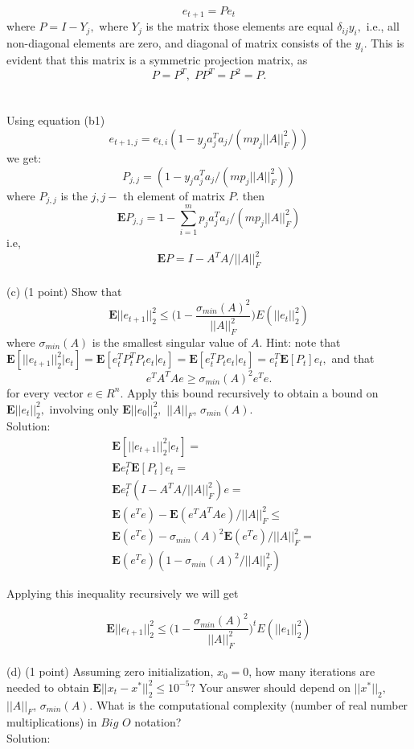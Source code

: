 \documentclass{article}
\begin{document}
$$
e_{t + 1} = P e_t
$$
where $P = I - Y_j,$ where $Y_j$ is the matrix those
elements are equal $\delta_{ij} y_i, $ i.e., all non-diagonal elements are zero, and diagonal of matrix consists of the $y_i.$
This is evident that this matrix is a symmetric projection matrix, as 
$$
P = P^T, \; PP^T = P^2 = P.
$$ \\ \\
Using equation (b1) 
$$
e_{t + 1, j} = e_{t, i}(1 - y_j a_j^Ta_j/(m p_j ||A||_F^2))
$$
we get:
$$
P_{j, j} = (1 - y_j a_j^Ta_j/(m p_j ||A||_F^2))
$$
where $P_{j, j}$ is the $j, j-$ th element of matrix $P.$
then
$$
\mathbf{E}P_{j, j} = 1 - \sum_{i=1}^{m} p_j a_j^Ta_j/(m p_j ||A||_F^2) 
$$
i.e, 
$$
\mathbf{E}P = I - A^TA/||A||_F^2
$$
\\

(c) (1 point) Show that\\
$$
\mathbf{E}||e_{t+1}||^2_2 \leq 
\big(1 - \frac{\sigma_{min}(A)^2}{||A||_F^2}\big) E(||e_t||^2_2)
$$
where $\sigma_{min}(A)$ is the smallest singular value of $A.$ Hint: note that 
$
\mathbf{E}[||e_{t+1}||^2_2|e_t] = 
\mathbf{E} [e_t^T P_t^T P_t e_t |e_t] = 
\mathbf{E} [e_t^T P_t e_t |e_t] = 
e_t^T \mathbf{E}[P_t]e_t,$ and that 
$$
e^T A^T A e \geq \sigma_{min}(A)^2 e^T e.
$$
for every vector $e \in R^n.$ Apply this bound recursively to obtain a bound on $\mathbf{E}||e_{t}||^2_2,$ involving only $\mathbf{E}||e_{0}||^2_2,$ $||A||_F$, $\sigma_{min}(A).$ \\

Solution: \\

\begin{align*}
& \mathbf{E}[||e_{t+1}||^2_2|e_t] = \\
& \mathbf{E}e_t^T \mathbf{E}[P_t]e_t = \\ 
&\mathbf{E}e^T_t (I - A^TA / ||A||_F^2)e = \\
&\mathbf{E}(e^Te) - \mathbf{E}(e^TA^TAe) / ||A||_F^2 \leq \\
&\mathbf{E}(e^Te) - \sigma_{min}(A)^2 \mathbf{E}(e^Te) 
/ ||A||_F^2 
=
\\
&\mathbf{E}(e^Te)(1 - \sigma_{min}(A)^2 / ||A||_F^2 )
\end{align*}

Applying this inequality recursively we will get 

$$
\mathbf{E}||e_{t+1}||^2_2 \leq 
\big(1 - \frac{\sigma_{min}(A)^2}{||A||_F^2}\big)^t E(||e_1||^2_2)
$$
\\
(d) (1 point) Assuming zero initialization, $x_0 = 0$, 
how many iterations are needed
to obtain $\mathbf{E}||x_t - x^*||_2^2 \leq 10^{-5}?$
Your answer should depend on $||x^*||_2,$ $||A||_F$, 
$\sigma_{min}(A).$ What is the computational complexity (number of real number multiplications) in $Big$ $O$ notation?
\\
Solution:\\
\end{document}
